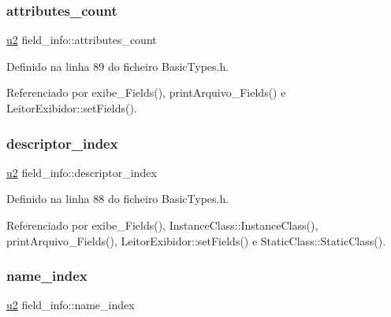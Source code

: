 \mbox{\label{structfield__info_a83bfa4ff84a608e3dbd1c3968ebe1b80}} 
\subsubsection{\texorpdfstring{attributes\+\_\+count}{attributes\_count}}
{\footnotesize\ttfamily \hyperlink{BasicTypes_8h_a732cde1300aafb73b0ea6c2558a7a54f}{u2} field\+\_\+info\+::attributes\+\_\+count}



Definido na linha 89 do ficheiro Basic\+Types.\+h.



Referenciado por exibe\+\_\+\+Fields(), print\+Arquivo\+\_\+\+Fields() e Leitor\+Exibidor\+::set\+Fields().

\mbox{\label{structfield__info_a12dd492b7fb1d61da1ac14938d97b07f}} 
\subsubsection{\texorpdfstring{descriptor\+\_\+index}{descriptor\_index}}
{\footnotesize\ttfamily \hyperlink{BasicTypes_8h_a732cde1300aafb73b0ea6c2558a7a54f}{u2} field\+\_\+info\+::descriptor\+\_\+index}



Definido na linha 88 do ficheiro Basic\+Types.\+h.



Referenciado por exibe\+\_\+\+Fields(), Instance\+Class\+::\+Instance\+Class(), print\+Arquivo\+\_\+\+Fields(), Leitor\+Exibidor\+::set\+Fields() e Static\+Class\+::\+Static\+Class().

\mbox{\label{structfield__info_a425e3ae85badd81c67ef00acca85ad9e}} 
\subsubsection{\texorpdfstring{name\+\_\+index}{name\_index}}
{\footnotesize\ttfamily \hyperlink{BasicTypes_8h_a732cde1300aafb73b0ea6c2558a7a54f}{u2} field\+\_\+info\+::name\+\_\+index}



